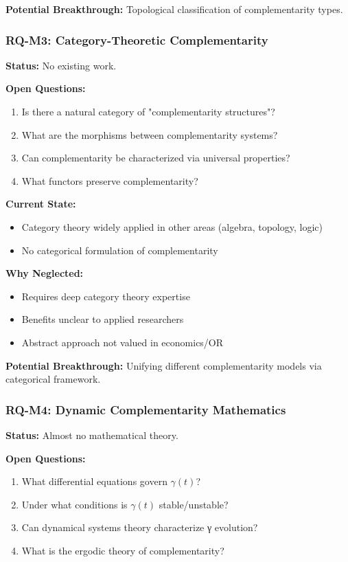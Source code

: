 \textbf{Potential Breakthrough:} Topological classification of complementarity types.

\subsubsection{RQ-M3: Category-Theoretic Complementarity}

\textbf{Status:} No existing work.

\textbf{Open Questions:}
\begin{enumerate}[noitemsep]
    \item Is there a natural category of "complementarity structures"?
    \item What are the morphisms between complementarity systems?
    \item Can complementarity be characterized via universal properties?
    \item What functors preserve complementarity?
\end{enumerate}

\textbf{Current State:}
\begin{itemize}[noitemsep]
    \item Category theory widely applied in other areas (algebra, topology, logic)
    \item No categorical formulation of complementarity
\end{itemize}

\textbf{Why Neglected:}
\begin{itemize}[noitemsep]
    \item Requires deep category theory expertise
    \item Benefits unclear to applied researchers
    \item Abstract approach not valued in economics/OR
\end{itemize}

\textbf{Potential Breakthrough:} Unifying different complementarity models via categorical framework.

\subsubsection{RQ-M4: Dynamic Complementarity Mathematics}

\textbf{Status:} Almost no mathematical theory.

\textbf{Open Questions:}
\begin{enumerate}[noitemsep]
    \item What differential equations govern $\gamma(t)$?
    \item Under what conditions is $\gamma(t)$ stable/unstable?
    \item Can dynamical systems theory characterize γ evolution?
    \item What is the ergodic theory of complementarity?
\end{enumerate}

